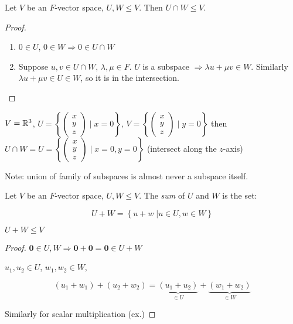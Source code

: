 \documentclass[a4paper]{article}
\begin{document}
\begin{prop} 
	Let $ V $ be an $ F $-vector space, $ U,W \leq V $. Then $ U \cap W \leq V $.	
\end{prop}

\begin{proof}
	\begin{enumerate}
		\item 	$ 0 \in U $, $ 0 \in W  \Rightarrow 0 \in U \cap W $ 
		\item Suppose $ u,v \in U \cap W $, $ \lambda, \mu \in F $.
		$ U $ is a subspace $ \Rightarrow  \lambda u + \mu v \in W $. Similarly $ \lambda u + \mu v \in U \in W $, so it is in the intersection. 
	\end{enumerate}
\end{proof}

\begin{eg}
	$ V = \mathbb{R}^{3} $, $ U = \left\{ \begin{pmatrix}
	x\\
	y\\
	z
	\end{pmatrix} \; | \; x = 0 \right\} $, $ V = \left\{ \begin{pmatrix}
	x\\
	y\\
	z
	\end{pmatrix} \; | \; y = 0 \right\}  $ then $ U \cap W = U = \left\{ \begin{pmatrix}
	x\\
	y\\
	z
	\end{pmatrix} \; | \; x = 0, y= 0 \right\}  $ (intersect along the $ z $-axis)
\end{eg}

Note: union of family of subspaces is almost never a subspace itself.


\begin{defi}
	Let $ V $ be an $ F $-vector space, $ U,W \leq V $. The \emph{sum} of $ U $ and $ W $ is the set:
	
	\[ U + W = \left\{  u + w \; | u \in U, w \in W    \right\}  \]
\end{defi}

\begin{prop} 
	$ U + W \leq V $
\end{prop}

\begin{proof}
	$ \mathbf{0} \in U,W \Rightarrow \mathbf{0} + \mathbf{0} = \mathbf{0} \in U + W $
	
	$ u_{1},u_{2} \in U $, $ w_{1},w_{2} \in W $, 
	
	\[ (u_{1} + w_{1}) + (u_{2} + w_{2}) = \underbrace{(u_{1} + u_{2})}_{\in U}  + \underbrace{(w_{1} + w_{2})}_{\in W} \]
	
	Similarly for scalar multiplication (ex.)
\end{proof}
\end{document}
